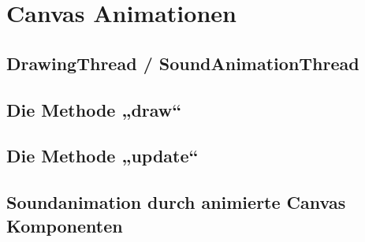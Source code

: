 \chapter{Canvas Animationen}
\section{DrawingThread / SoundAnimationThread}
\section{Die Methode „draw“}
\section{Die Methode „update“}
\section{Soundanimation durch animierte Canvas Komponenten}

	